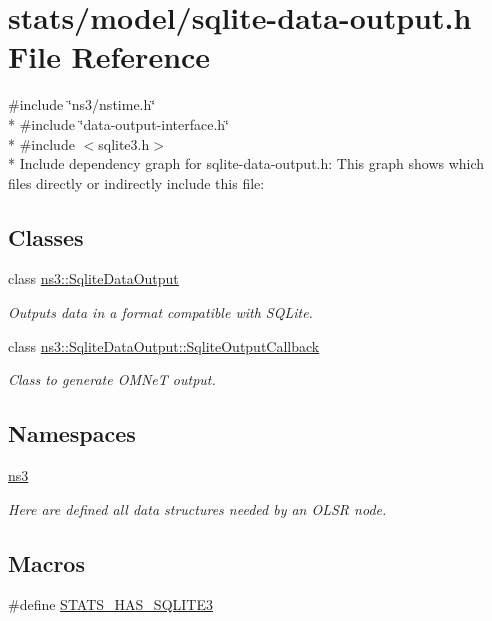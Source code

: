 \hypertarget{sqlite-data-output_8h}{}\section{stats/model/sqlite-\/data-\/output.h File Reference}
\label{sqlite-data-output_8h}
{\ttfamily \#include \char`\"{}ns3/nstime.\+h\char`\"{}}\\*
{\ttfamily \#include \char`\"{}data-\/output-\/interface.\+h\char`\"{}}\\*
{\ttfamily \#include $<$sqlite3.\+h$>$}\\*
Include dependency graph for sqlite-\/data-\/output.h\+:
This graph shows which files directly or indirectly include this file\+:
\subsection*{Classes}
\begin{DoxyCompactItemize}
\item 
class \hyperlink{classns3_1_1SqliteDataOutput}{ns3\+::\+Sqlite\+Data\+Output}
\begin{DoxyCompactList}\small\item\em Outputs data in a format compatible with S\+Q\+Lite. \end{DoxyCompactList}\item 
class \hyperlink{classns3_1_1SqliteDataOutput_1_1SqliteOutputCallback}{ns3\+::\+Sqlite\+Data\+Output\+::\+Sqlite\+Output\+Callback}
\begin{DoxyCompactList}\small\item\em Class to generate O\+M\+NeT output. \end{DoxyCompactList}\end{DoxyCompactItemize}
\subsection*{Namespaces}
\begin{DoxyCompactItemize}
\item 
 \hyperlink{namespacens3}{ns3}
\begin{DoxyCompactList}\small\item\em Here are defined all data structures needed by an O\+L\+SR node. \end{DoxyCompactList}\end{DoxyCompactItemize}
\subsection*{Macros}
\begin{DoxyCompactItemize}
\item 
\#define \hyperlink{sqlite-data-output_8h_a3c3effe06c1d741ece77b8dc1d97c6f7}{S\+T\+A\+T\+S\+\_\+\+H\+A\+S\+\_\+\+S\+Q\+L\+I\+T\+E3}
\end{DoxyCompactItemize}


